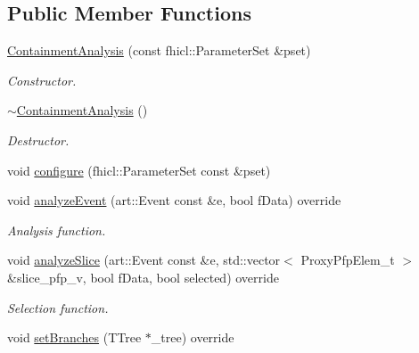\subsection*{Public Member Functions}
\begin{DoxyCompactItemize}
\item 
\hyperlink{classanalysis_1_1ContainmentAnalysis_a1544702632da81fbf99462a4099ad15e}{Containment\+Analysis} (const fhicl\+::\+Parameter\+Set \&pset)
\begin{DoxyCompactList}\small\item\em Constructor. \end{DoxyCompactList}\item 
\hyperlink{classanalysis_1_1ContainmentAnalysis_ae5f996c6ad46bc60af73f632eb3b44ae}{$\sim$\+Containment\+Analysis} ()\hypertarget{classanalysis_1_1ContainmentAnalysis_ae5f996c6ad46bc60af73f632eb3b44ae}{}\label{classanalysis_1_1ContainmentAnalysis_ae5f996c6ad46bc60af73f632eb3b44ae}

\begin{DoxyCompactList}\small\item\em Destructor. \end{DoxyCompactList}\item 
void \hyperlink{classanalysis_1_1ContainmentAnalysis_a0ea0287e139776b12c996ca624e8e8eb}{configure} (fhicl\+::\+Parameter\+Set const \&pset)
\item 
void \hyperlink{classanalysis_1_1ContainmentAnalysis_a5bcf033310f0e8f58fd6f4f46f216985}{analyze\+Event} (art\+::\+Event const \&e, bool f\+Data) override\hypertarget{classanalysis_1_1ContainmentAnalysis_a5bcf033310f0e8f58fd6f4f46f216985}{}\label{classanalysis_1_1ContainmentAnalysis_a5bcf033310f0e8f58fd6f4f46f216985}

\begin{DoxyCompactList}\small\item\em Analysis function. \end{DoxyCompactList}\item 
void \hyperlink{classanalysis_1_1ContainmentAnalysis_a6e3c839d18ff3001b46be5fde80a5d04}{analyze\+Slice} (art\+::\+Event const \&e, std\+::vector$<$ Proxy\+Pfp\+Elem\+\_\+t $>$ \&slice\+\_\+pfp\+\_\+v, bool f\+Data, bool selected) override
\begin{DoxyCompactList}\small\item\em Selection function. \end{DoxyCompactList}\item 
void \hyperlink{classanalysis_1_1ContainmentAnalysis_a468421b8ba753e554a0f96f4a912f8ff}{set\+Branches} (T\+Tree $\ast$\+\_\+tree) override\hypertarget{classanalysis_1_1ContainmentAnalysis_a468421b8ba753e554a0f96f4a912f8ff}{}\label{classanalysis_1_1ContainmentAnalysis_a468421b8ba753e554a0f96f4a912f8ff}


\end{DoxyCompactItemize}
